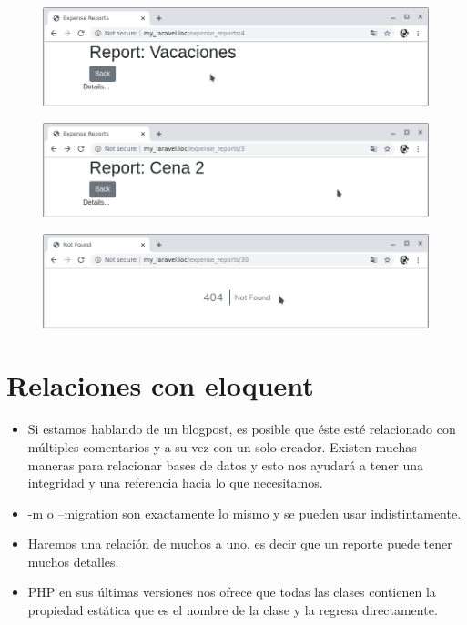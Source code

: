 \documentclass{article}
\begin{document}
\begin{figure}[h!]
  \centering
  \includegraphics[scale=0.5]{./Pictures/099_expense_reports.png}
\end{figure}

\begin{figure}[h!]
  \centering
  \includegraphics[scale=0.5]{./Pictures/100_expense_report_id.png}
\end{figure}

\begin{figure}[h!]
  \centering
  \includegraphics[scale=0.5]{./Pictures/101_expense_report_id_error.png}
\end{figure}

\newpage

\section{Relaciones con eloquent}%
\begin{itemize}
  \item Si estamos hablando de un blogpost, es posible que éste esté
    relacionado con múltiples comentarios y a su vez con un solo creador.
    Existen muchas maneras para relacionar bases de datos y esto nos ayudará a
    tener una integridad y una referencia hacia lo que necesitamos.
  \item -m o –migration son exactamente lo mismo y se pueden usar
    indistintamente.
  \item Haremos una relación de muchos a uno, es decir que un reporte puede
    tener muchos detalles.
  \item PHP en sus últimas versiones nos ofrece que todas las clases contienen
    la propiedad estática que es el nombre de la clase y la regresa
    directamente.
\end{itemize}
\end{document}
